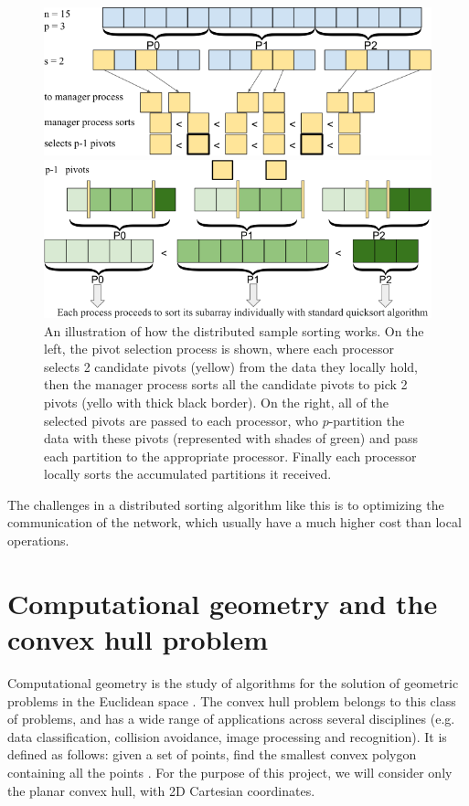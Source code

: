 \documentclass[]{finalproject}
\begin{document}
\begin{figure}[H]
\centering
\begin{minipage}{.49\linewidth}
\includegraphics[width=\linewidth]{par-qs-1.png}
\end{minipage}
\begin{minipage}{.49\linewidth}
\includegraphics[width=\linewidth]{par-qs-2.png}
\end{minipage}
\caption{An illustration of how the distributed sample sorting works. On the left, the pivot selection process is shown, where each processor selects 2 candidate pivots (yellow) from the data they locally hold, then the manager process sorts all the candidate pivots to pick 2 pivots (yello with thick black border). On the right, all of the selected pivots are passed to each processor, who $p$-partition the data with these pivots (represented with shades of green) and pass each partition to the appropriate processor. Finally each processor locally sorts the accumulated partitions it received.}
\label{fig:par-qs}
\end{figure}

The challenges in a distributed sorting algorithm like this is to optimizing the communication of the network, which usually have a much higher cost than local operations.

\section{Computational geometry and the convex hull problem}
Computational geometry is the study of algorithms for the solution of geometric problems in the Euclidean space \cite{jaja2000perspective}.
The convex hull problem belongs to this class of problems, and has a wide range of applications across several disciplines
(e.g. data classification, collision avoidance, image processing and recognition). It is defined as follows:
given a set of points, find the smallest convex polygon containing all the points \cite{geowiki}.
For the purpose of this project, we will consider only the planar convex hull, with 2D Cartesian coordinates.
\end{document}
